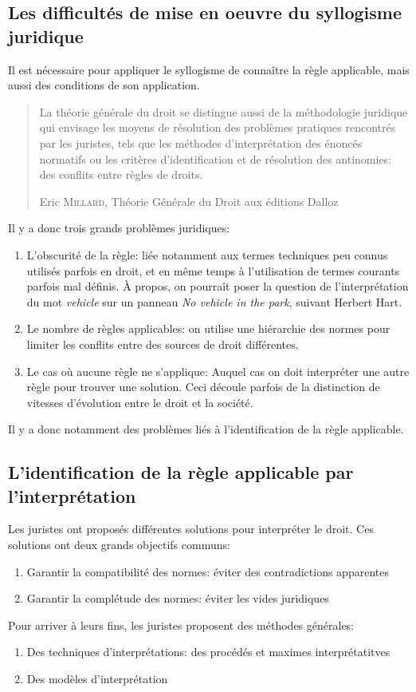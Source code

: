 \documentclass[math]{cours}
\begin{document}
\subsection{Les difficultés de mise en oeuvre du syllogisme juridique}
Il est nécessaire pour appliquer le syllogisme de connaître la règle applicable, mais aussi des conditions de son application.
\begin{quote}
	La théorie générale du droit se distingue aussi de la méthodologie juridique qui envisage les moyens de résolution des problèmes pratiques rencontrés par les juristes, tels que les méthodes d'interprétation des énoncés normatifs ou les critères d'identification et de résolution des antinomies: des conflits entre règles de droits.
	\begin{flushright}
		Eric \textsc{Millard}, Théorie Générale du Droit aux éditions Dalloz
	\end{flushright}

\end{quote}

Il y a donc trois grands problèmes juridiques:
\begin{enumerate}
	\item L'obscurité de la règle: liée notamment aux termes techniques peu connus utilisés parfois en droit, et en même temps à l'utilisation de termes courants parfois mal définis.
		À propos, on pourraît poser la question de l'interprétation du mot \textit{vehicle} sur un panneau \textit{No vehicle in the park}, suivant Herbert Hart.
	\item Le nombre de règles applicables: on utilise une hiérarchie des normes pour limiter les conflits entre des sources de droit différentes.
	\item Le cas où aucune règle ne s'applique: Auquel cas on doit interpréter une autre règle pour trouver une solution.
		Ceci découle parfois de la distinction de vitesses d'évolution entre le droit et la société.
\end{enumerate}
Il y a donc notamment des problèmes liés à l'identification de la règle applicable.

\subsection{L'identification de la règle applicable par l'interprétation}
Les juristes ont proposés différentes solutions pour interpréter le droit.
Ces solutions ont deux grands objectifs communs:
\begin{enumerate}
	\item Garantir la compatibilité des normes: éviter des contradictions apparentes
	\item Garantir la complétude des normes: éviter les vides juridiques
\end{enumerate}
Pour arriver à leurs fins, les juristes proposent des méthodes générales:
\begin{enumerate}
	\item Des techniques d'interprétations: des procédés et maximes interprétatitves
	\item Des modèles d'interprétation
\end{enumerate}
\end{document}
